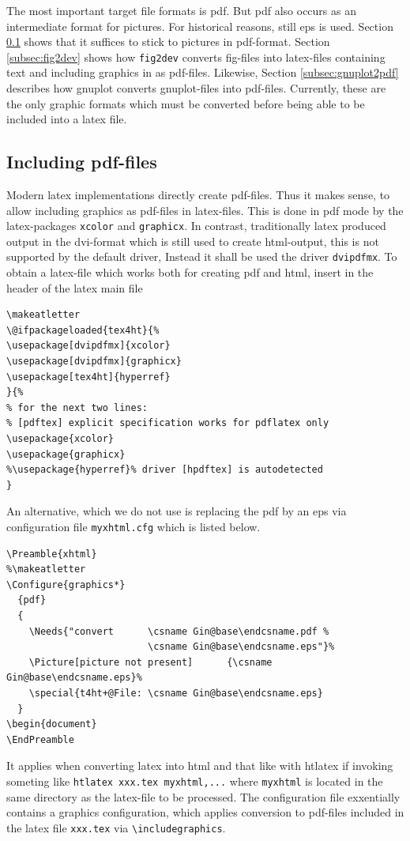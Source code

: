 \documentclass[12pt]{article}
\begin{document}
The most important target file formats is \gls{pdf}. 
But pdf also occurs as an intermediate format for pictures. 
For historical reasons, still \gls{eps} is used. 
Section \ref{subsec:figpdf} shows that it suffices to stick to pictures 
in pdf-format. 
Section \ref{subsec:fig2dev} shows how {\tt fig2dev} converts fig-files 
into latex-files containing text and including graphics in as pdf-files. 
Likewise, Section \ref{subsec:gnuplot2pdf} describes 
how gnuplot converts gnuplot-files into pdf-files. 
Currently, these are the only graphic formats which must be converted 
before being able to be included into a latex file. 



\subsection{Including pdf-files}\label{subsec:figpdf}

Modern latex implementations directly create pdf-files. 
Thus it makes sense, to allow including graphics as pdf-files 
in latex-files. 
This is done in pdf mode 
by the latex-packages {\tt xcolor} and {\tt graphicx}. 
In contrast, traditionally latex produced output in the \gls{dvi}-format 
which is still used to create \gls{html}-output, 
this is not supported by the default driver, 
Instead it shall be used the driver {\tt dvipdfmx}. 
To obtain a latex-file which works both for creating pdf and html, 
insert in the header of the latex main file 
%
\lstset{language=tex, basicstyle=\small}
\begin{lstlisting}
\makeatletter
\@ifpackageloaded{tex4ht}{%
\usepackage[dvipdfmx]{xcolor}
\usepackage[dvipdfmx]{graphicx}
\usepackage[tex4ht]{hyperref}
}{%
% for the next two lines: 
% [pdftex] explicit specification works for pdflatex only 
\usepackage{xcolor}
\usepackage{graphicx}
%\usepackage{hyperref}% driver [hpdftex] is autodetected 
}
\end{lstlisting}

An alternative, which we do not use 
is replacing the pdf by an \gls{eps} via configuration file {\tt myxhtml.cfg} 
which is listed below. 
%
\lstset{language=tex, basicstyle=\scriptsize}
\begin{lstlisting}
\Preamble{xhtml}
%\makeatletter
\Configure{graphics*}  
  {pdf}  
  {
    \Needs{"convert      \csname Gin@base\endcsname.pdf %
                         \csname Gin@base\endcsname.eps"}%  
    \Picture[picture not present]      {\csname Gin@base\endcsname.eps}%  
    \special{t4ht+@File: \csname Gin@base\endcsname.eps}
  }
\begin{document}
\EndPreamble

\end{lstlisting}
%
It applies when converting latex into html and that like 
with htlatex if invoking someting like {\tt htlatex xxx.tex myxhtml,...} 
where {\tt myxhtml} is located in the same directory as the latex-file 
to be processed. 
The configuration file exxentially contains a graphics configuration, 
which applies conversion to pdf-files included in the latex file {\tt xxx.tex}
via {\tt \textbackslash includegraphics}. 
\end{document}
